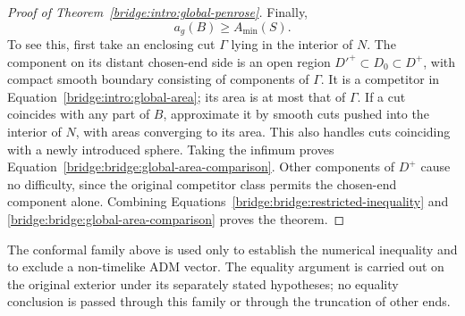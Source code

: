 \begin{proof}[Proof of Theorem~\ref{bridge:intro:global-penrose}]
Finally,
\begin{equation}
\label{bridge:bridge:global-area-comparison}
                         a_g(B)\ge A_{\min}(S).
\end{equation}
To see this, first take an enclosing cut $\Gamma$ lying in the interior
of $N$.  The component on its distant chosen-end side is an open region
$D'^+\subset D_0\subset D^+$, with compact smooth boundary consisting
of components of $\Gamma$.  It is a competitor in
Equation~\eqref{bridge:intro:global-area}; its area is at most that of $\Gamma$.
If a cut coincides with any part of $B$, approximate it by smooth cuts
pushed into the interior of $N$, with areas converging to its area.
This also handles cuts coinciding with a newly introduced sphere.
Taking the infimum proves
Equation~\eqref{bridge:bridge:global-area-comparison}.  Other components of
$D^+$ cause no difficulty, since the original competitor class permits
the chosen-end component alone.  Combining
Equations~\eqref{bridge:bridge:restricted-inequality} and
\eqref{bridge:bridge:global-area-comparison} proves the theorem.
\end{proof}

The conformal family above is used only to establish the numerical
inequality and to exclude a non-timelike ADM vector.  The equality
argument is carried out on the original exterior under its separately
stated hypotheses; no equality conclusion is passed through this family
or through the truncation of other ends.
